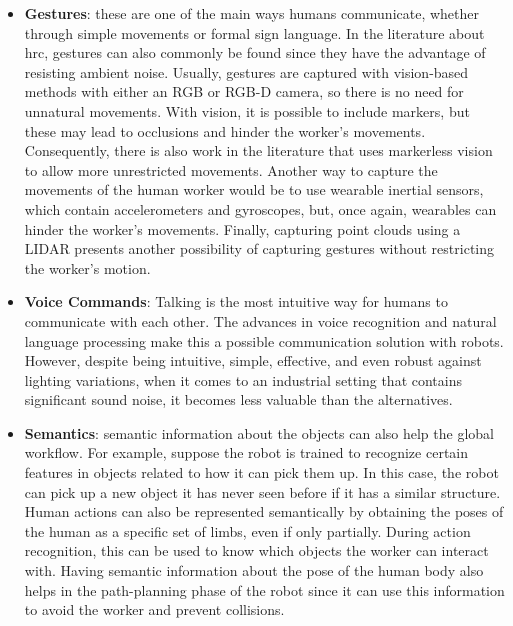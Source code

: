 \begin{itemize}
\item \textbf{Gestures}: these are one of the main ways humans communicate, whether through simple movements or formal sign language. In the literature about \acs{hrc}, gestures can also commonly be found since they have the advantage of resisting ambient noise. Usually, gestures are captured with vision-based methods with either an RGB or RGB-D camera, so there is no need for unnatural movements. With vision, it is possible to include markers, but these may lead to occlusions and hinder the worker's movements. Consequently, there is also work in the literature that uses markerless vision to allow more unrestricted movements. Another way to capture the movements of the human worker would be to use wearable inertial sensors, which contain accelerometers and gyroscopes, but, once again, wearables can hinder the worker's movements. Finally, capturing point clouds using a LIDAR presents another possibility of capturing gestures without restricting the worker's motion.


\item \textbf{Voice Commands}: Talking is the most intuitive way for humans to communicate with each other. The advances in voice recognition and natural language processing make this a possible communication solution with robots. However, despite being intuitive, simple, effective, and even robust against lighting variations, when it comes to an industrial setting that contains significant sound noise, it becomes less valuable than the alternatives.

\item \textbf{Semantics}: semantic information about the objects can also help the global workflow. For example, suppose the robot is trained to recognize certain features in objects related to how it can pick them up. In this case, the robot can pick up a new object it has never seen before if it has a similar structure. Human actions can also be represented semantically by obtaining the poses of the human as a specific set of limbs, even if only partially. During action recognition, this can be used to know which objects the worker can interact with. Having semantic information about the pose of the human body also helps in the path-planning phase of the robot since it can use this information to avoid the worker and prevent collisions.


\end{itemize}
